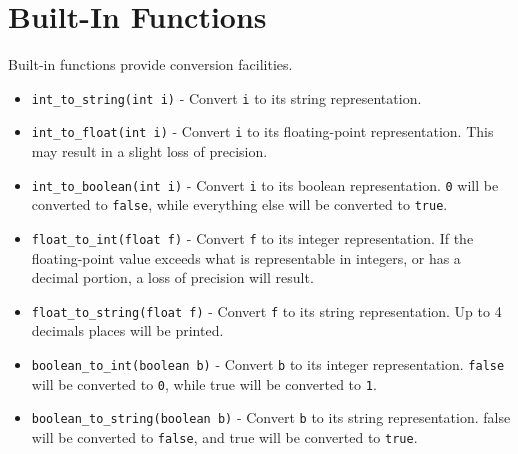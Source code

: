 \documentclass[titlepage]{article}
\begin{document}
\section{Built-In Functions}
Built-in functions provide conversion facilities.
\begin{itemize}

\item \verb|int_to_string(int i)| - Convert \verb|i| to its string representation.
\item \verb|int_to_float(int i)| - Convert \verb|i| to its floating-point representation. This may result in a slight loss of precision.
\item \verb|int_to_boolean(int i)| - Convert \verb|i| to its boolean representation. \verb|0| will be converted to \verb|false|, while everything else will be converted to \verb|true|.
\item \verb|float_to_int(float f)| - Convert \verb|f| to its integer representation. If the floating-point value exceeds what is representable in integers, or has a decimal portion, a loss of precision will result.
\item \verb|float_to_string(float f)| - Convert \verb|f| to its string representation. Up to 4 decimals places will be printed.
\item \verb|boolean_to_int(boolean b)| - Convert \verb|b| to its integer representation. \verb|false| will be converted to \verb|0|, while true will be converted to \verb|1|.
\item \verb|boolean_to_string(boolean b)| - Convert \verb|b| to its string representation. false will be converted to \verb|false|, and true will be converted to \verb|true|.
\end{itemize}
\end{document}

